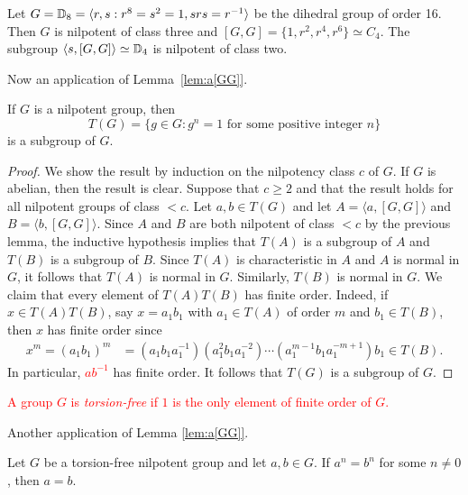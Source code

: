 \begin{example}
	Let $G=\mathbb{D}_{8}=\langle r,s:r^{8}=s^2=1,srs=r^{-1}\rangle$ be the dihedral group of order 
	16. Then $G$ is nilpotent of class three and 
	$[G,G]=\{1,r^2,r^4,r^6\}\simeq C_4$. The subgroup $\langle
	s,[G,G]\rangle\simeq\mathbb{D}_4$ is nilpotent of class two.
\end{example}

Now an application of Lemma~\ref{lem:a[GG]}. 

\begin{theorem}
	\label{thm:T(nilpotent)}
	If $G$ is a nilpotent group, then 
	\[
	T(G)=\{g\in G:g^n=1\text{ for some positive integer }n\}
	\]
	is a subgroup of $G$. 
\end{theorem}

\begin{proof} 
    We show the result by induction on the nilpotency class $c$ of $G$.
    If $G$ is abelian, then the result is clear. Suppose that $c\geq 2$ and that the result holds for all nilpotent 
    groups of class $<c$. 
	Let $a,b\in T(G)$ and let $A=\langle a,[G,G]\rangle$ and $B=\langle b,[G,G]\rangle$. 
	Since $A$ and $B$ are both nilpotent of class $<c$ by the previous lemma, the inductive hypothesis implies that
	$T(A)$ is a subgroup of $A$ and $T(B)$ is a subgroup of $B$. 
	Since $T(A)$ is characteristic in $A$ and $A$ is normal in $G$, it follows that 
	$T(A)$ is
	normal in $G$. Similarly, $T(B)$ is normal in $G$.  
	We claim that every element of $T(A)T(B)$ has finite order. Indeed, if 
	$x\in T(A)T(B)$, say $x=a_1b_1$ with 
	$a_1\in T(A)$ of order $m$ and $b_1\in T(B)$, then $x$ has finite order since  
	\begin{align*}
	x^m=(a_1b_1)^m&=
		(a_1b_1a_1^{-1})(a_1^2b_1a_1^{-2})\cdots (a_1^{m-1} b_1 a_1^{-m+1})b_1\in T(B).
	\end{align*}
	In particular, \textcolor{red}{$ab^{-1}$} has finite order. It follows that 
	$T(G)$ is a subgroup of $G$. 
\end{proof}

\textcolor{red}{A group $G$ is {\em torsion-free} if $1$ is the only element of finite order of $G$.}

Another application of Lemma \ref{lem:a[GG]}.

\begin{theorem}
	\label{thm:a=b}
	Let $G$ be a torsion-free nilpotent group and let $a,b\in G$. If $a^n=b^n$ for some 
	$n\ne 0$, then $a=b$.
\end{theorem}

